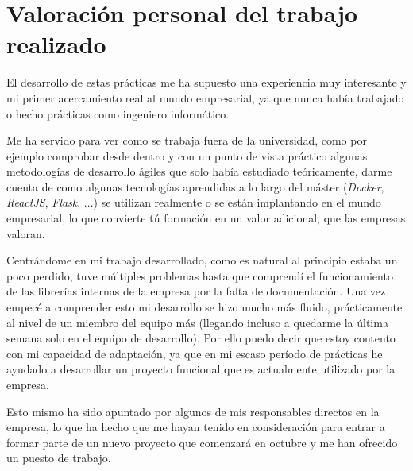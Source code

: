 \chapter{Valoración personal del trabajo realizado}

El desarrollo de estas prácticas me ha supuesto una experiencia muy interesante y mi primer acercamiento real al mundo empresarial, ya que nunca había trabajado o hecho prácticas como ingeniero informático.

Me ha servido para ver como se trabaja fuera de la universidad, como por ejemplo comprobar desde dentro y con un punto de vista práctico algunas metodologías de desarrollo ágiles que solo había estudiado teóricamente, darme cuenta de como algunas tecnologías aprendidas a lo largo del máster (\textit{Docker}, \textit{ReactJS}, \textit{Flask}, ...) se utilizan realmente o se están implantando en el mundo empresarial, lo que convierte tú formación en un valor adicional, que las empresas valoran.

Centrándome en mi trabajo desarrollado, como es natural al principio estaba un poco perdido, tuve múltiples problemas hasta que comprendí el funcionamiento de las librerías internas de la empresa por la falta de documentación. Una vez empecé a comprender esto mi desarrollo se hizo mucho más fluido, prácticamente al nivel de un miembro del equipo más (llegando incluso a quedarme la última semana solo en el equipo de desarrollo). Por ello puedo decir que estoy contento con mi capacidad de adaptación, ya que en mi escaso período de prácticas he ayudado a desarrollar un proyecto funcional que es actualmente utilizado por la empresa.

Esto mismo ha sido apuntado por algunos de mis responsables directos en la empresa, lo que ha hecho que me hayan tenido en consideración para entrar a formar parte de un nuevo proyecto que comenzará en octubre y me han ofrecido un puesto de trabajo.